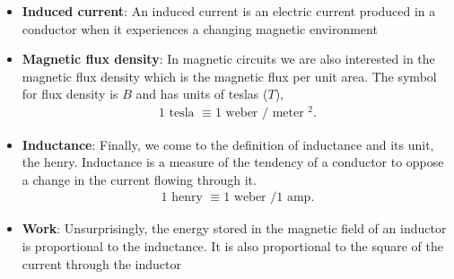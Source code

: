 \documentclass{report}
\begin{document}
\begin{itemize}
            \bigbreak \noindent 
            This is how electromagnets can be created. The north pole is the exiting end (right side), while the south pole is the entering end (left side). 
            \bigbreak \noindent 
            If the current changes, there will be a commensurate change in the magnetic field. Further, this change in the field will induce a current in the conductor that creates a magnetic field that opposes the original change in the field This is known as Lenz's law. Alternately, it can be stated that the induced current caused by a changing magnetic field will oppose the change in the original current that created that change in the original magnetic field.
            \bigbreak \noindent 
            At this point we can offer a proper definition of the weber:
            \begin{quote}
               \textit{1 weber $ \equiv $ the magnetic flux that, acting on a single loop of a conductor, produces a potential of 1 volt if the flux is reduced to zero at an even rate over 1 sec}
            \end{quote}
        \item \textbf{Induced current}: An induced current is an electric current produced in a conductor when it experiences a changing magnetic environment
        \item \textbf{Magnetic flux density}: In magnetic circuits we are also interested in the magnetic flux density which is the magnetic flux per unit area. The symbol for flux density is $B$ and has units of teslas ($T$),
            \begin{align*}
                1 \text{ tesla } \equiv 1 \text{ weber } / \text{ meter }^{2}
            .\end{align*}
        \item \textbf{Inductance}: Finally, we come to the definition of inductance and its unit, the henry.
            \bigbreak \noindent 
            Inductance is a measure of the tendency of a conductor to oppose a change in the current flowing through it.
            \begin{align*}
                1 \text{ henry } \equiv  1 \text{ weber } / 1 \text{ amp}
            .\end{align*}
        \item \textbf{Work}: Unsurprisingly, the energy stored in the magnetic field of an inductor is proportional to the inductance. It is also proportional to the square of the current through the inductor
            \begin{align*}

\end{align*}
\end{itemize}
\end{document}

